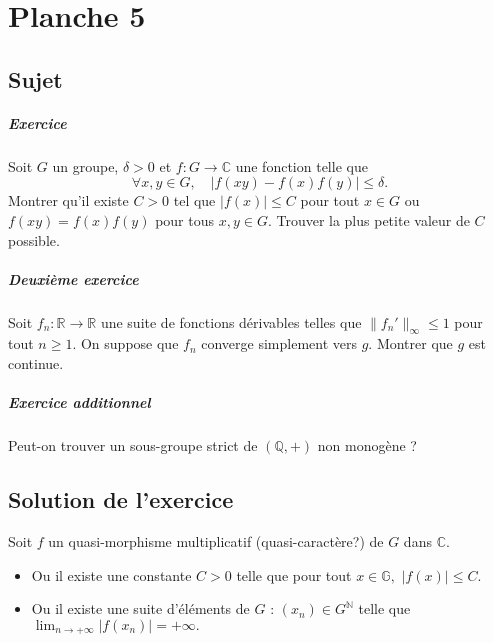 \chapter{Planche 5}

\section{Sujet}

\paragraph{Exercice}
Soit $G$ un groupe, $\delta > 0$ et $f : G \to \mathbb C$ une fonction telle que
\[
\forall x,y \in G,\quad |f(xy)-f(x)f(y)| \leqslant \delta.
\]
Montrer qu'il existe $C > 0$ tel que $|f(x)| \leqslant C$ pour tout $x \in G$ ou $f(xy) = f(x)f(y)$ pour tous $x,y \in G$.
Trouver la plus petite valeur de $C$ possible.

\paragraph{Deuxième exercice}

Soit $f_n : \mathbb R \to \mathbb R$ une suite de fonctions dérivables telles que $\|f_n'\|_\infty \leqslant 1$ pour tout $n\geqslant 1$. On suppose que $f_n$ converge simplement vers $g$. Montrer que $g$ est continue.

\paragraph{Exercice additionnel}
Peut-on trouver un sous-groupe strict de $(\mathbb Q,+)$ non monogène ?

\section{Solution de l'exercice}

Soit $f$ un quasi-morphisme multiplicatif (quasi-caractère?) de $G$ dans $\mathbb{C}.$\\

\begin{itemize}
\item Ou il existe une constante $C>0$ telle que pour tout $x\in \mathbb{G},$ $\displaystyle \vert f(x) \vert \leq C.$
\item Ou il existe une suite d'éléments de $G$ : $\displaystyle (x_{n})\in G^{\mathbb{N}}$ telle que $\displaystyle \lim_{n\rightarrow +\infty} \vert f(x_{n})\vert =+\infty.$
\end{itemize}

